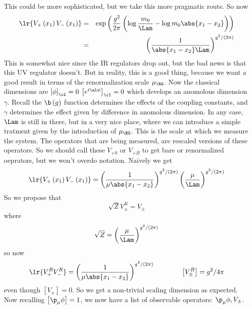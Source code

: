 \documentclass{booc}
\begin{document}
This could be more sophisticated, but we take this more pragmatic route. 
So now
\begin{eqnarray}
\lr{V_+\left( x_1 \right)V_-\left( x_1 \right)}&=& 
\exp\left( 
\frac{g^2}{2\pi}
\left( 
\log\frac{m_0}{\Lam}
 - \log m_0 \abs{x_1 - x_2}
\right)
\right)
\\ &=& 
\left( 
\frac{1}{\abs{x_1- x_2} \Lam}
\right)^{g^2 / \left( 2\pi \right)}
\end{eqnarray}
This is somewhat nice since 
the IR regulators drop out,
but the bad news is that this UV regulator doesn't.
But in reality, this is a good thing, 
because we want a good result in terms of the renormalization scale $\mu_\RG$.
Now the classical dimensions are
$\left[ \phi \right]_\cl = 0$
$\left[ e^{i\al \phi} \right]_\cl = 0$
which develops an anomolous dimension $\gamma$. 
Recall the $\b\left( g \right)$ function determines the 
effects of the coupling constants, 
and $\gamma$ determines the effect given by difference in anomolous dimension.
In any case, $\Lam$ is still in there, 
but in a very nice place, where we can introduce a simple tratment given by
the introduction of $\mu_\RG$.
This is the scale at which we measure the system.
The operators that are being measured, are rescaled versions of these operators. 
So we should call these
$V_{+0}$ or $V_{+B}$ to get bare or renormalized oeprators, but we won't overdo notation. 
Naively we get
\begin{equation}
\lr{V_+\left( x_1 \right)V_-\left( x_1 \right)}=
\left( 
\frac{1}{\mu\abs{x_1 - x_2}}
\right)^{g^2 / \left( 2\pi \right)}
\left( \frac{\mu}{\Lam} \right)^{g^2 / \left( 2\pi \right)}
\end{equation}
So we propose that
\begin{equation}
\sqrt{Z} V_{\pm}^R = V_\pm
\end{equation}
where
\begin{equation}
\sqrt{Z} = 
\left( \frac{\mu}{\Lam} \right)^{g^2 / \left( 2\pi \right)}
\end{equation}
so now
\begin{equation}
\lr{V_+^RV_-^R}=
\left( \frac{1}{\mu\abs{x_1 - x_2}} \right)^{g^2 / \left( 2\pi \right)}
\qquad\qquad
\left[ V_{\pm}^R \right] = g^2 / 4\pi
\end{equation}
even though $\left[ V_{\pm} \right] = 0$.
So we get a non-trivial scaling dimension as expected.
Now recalling $\left[ \p_\mu \phi \right] = 1$,
we now have a list of observable operators: $\p_\mu \phi , V_{\pm}$.
\end{document}
